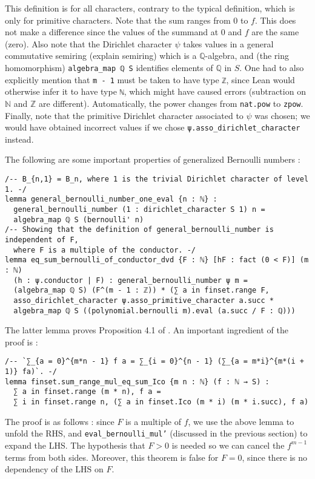 \documentclass[a4paper,UKenglish,cleveref, autoref, thm-restate]{lipics-v2021}
\newcommand{\lean}[1]{\texttt{#1}\xspace} %
\begin{document}
This definition is for all characters, contrary to the typical definition, which is only for primitive characters. 
Note that the sum ranges from 0 to $f$. This does not make a difference since the 
values of the summand at 0 and $f$ are the same (zero). Also note that the Dirichlet 
character $\psi$ takes values in a general commutative semiring (explain semiring) 
which is a $\mathbb{Q}$-algebra, and (the ring homomorphism) \lean{algebra\_map ℚ S} 
identifies elements of $\mathbb{Q}$ in $S$. One had to also explicitly mention that 
\lean{m - 1} must be taken to have type \lean{ℤ}, since Lean would otherwise infer 
it to have type \lean{ℕ}, which might have caused errors (subtraction on $\mathbb{N}$ 
and $\mathbb{Z}$ are different). Automatically, the power changes from \lean{nat.pow} to 
\lean{zpow}. Finally, note that the primitive Dirichlet character associated to $\psi$ was 
chosen; we would have obtained incorrect values if we chose \lean{ψ.asso\_dirichlet\_character} instead.  

The following are some important properties of generalized Bernoulli numbers : 
\begin{lstlisting}
/-- B_{n,1} = B_n, where 1 is the trivial Dirichlet character of level 1. -/
lemma general_bernoulli_number_one_eval {n : ℕ} :
  general_bernoulli_number (1 : dirichlet_character S 1) n = 
  algebra_map ℚ S (bernoulli' n) 
/-- Showing that the definition of general_bernoulli_number is independent of F,
  where F is a multiple of the conductor. -/
lemma eq_sum_bernoulli_of_conductor_dvd {F : ℕ} [hF : fact (0 < F)] (m : ℕ) 
  (h : ψ.conductor | F) : general_bernoulli_number ψ m = 
  (algebra_map ℚ S) (F^(m - 1 : ℤ)) * (∑ a in finset.range F, 
  asso_dirichlet_character ψ.asso_primitive_character a.succ *
  algebra_map ℚ S ((polynomial.bernoulli m).eval (a.succ / F : ℚ))) 
\end{lstlisting}

The latter lemma proves Proposition 4.1 of \cite{cyc}. An important ingredient of the proof is : 
\begin{lstlisting}
/-- `∑_{a = 0}^{m*n - 1} f a = ∑_{i = 0}^{n - 1} (∑_{a = m*i}^{m*(i + 1)} fa)`. -/
lemma finset.sum_range_mul_eq_sum_Ico {m n : ℕ} (f : ℕ → S) :
  ∑ a in finset.range (m * n), f a =
  ∑ i in finset.range n, (∑ a in finset.Ico (m * i) (m * i.succ), f a) 
\end{lstlisting}

The proof is as follows : since $F$ is a multiple of $f$, we use the above lemma to unfold the RHS, 
and \lean{eval\_bernoulli\_mul'} (discussed in the previous section) to expand the LHS. The hypothesis 
that $F > 0$ is needed so we can cancel the $f^{m - 1}$ terms from both sides. Moreover, this theorem is 
false for $F = 0$, since there is no dependency of the LHS on $F$. 
\end{document}

